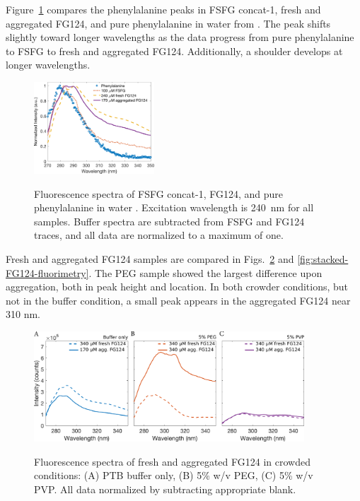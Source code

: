 Figure~\ref{fig:phe-comparison} compares the phenylalanine peaks in FSFG concat-1, fresh and aggregated FG124, and pure phenylalanine in water from \cite{prahl95}.  The peak shifts slightly toward longer wavelengths as the data progress from pure  phenylalanine to FSFG to fresh and aggregated FG124.  Additionally, a shoulder develops at longer wavelengths.

\begin{figure}
\caption[Fluorescence spectra of FSFG, FG124, and phenylalanine.]{Fluorescence spectra of FSFG concat-1, FG124, and pure phenylalanine in water \cite{prahl95}. Excitation wavelength is 240~nm for all samples. Buffer spectra are subtracted from FSFG and FG124 traces, and all data are normalized to a maximum of one.}
\centering
\includegraphics[width=0.4\textwidth]{figs/ch05/phe-comparison.pdf}
\label{fig:phe-comparison}
\end{figure}

Fresh and aggregated FG124 samples are compared in Figs.~\ref{fig:FG124-fresh-vs-agg} and \ref{fig:stacked-FG124-fluorimetry}.  The PEG sample showed the largest difference upon aggregation, both in peak height and location.  In both crowder conditions, but not in the buffer condition, a small peak appears in the aggregated FG124 near 310 nm.

\begin{figure}[t!]
\caption[FG124 fluorescence in crowded conditions.]{Fluorescence spectra of fresh and aggregated FG124 in crowded conditions: (A) PTB buffer only, (B) 5\% w/v PEG, (C) 5\% w/v PVP.  All data normalized by subtracting appropriate blank.}
\centering
\includegraphics[width=0.9\textwidth]{figs/ch05/FG124-fresh-vs-agg.pdf}
\label{fig:FG124-fresh-vs-agg}
\end{figure}

